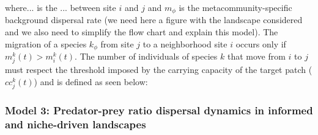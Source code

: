 %
%
%
%
%

where... is the ... between site $i$ and $j$ and $m_{\mathcal{\phi}}$
is the metacommunity-specific background dispersal rate (we need here
a figure with the landscape considered and we also need to simplify
the flow chart and explain this model). The migration of a species
$k_{\mathcal{\phi}}$ from site $j$ to a neighborhood site $i$ occurs
only if $m_{j}^k(t) > m_{i}^k(t)$. The number of individuals of
species $k$ that move from $i$ to $j$ must respect the threshold
imposed by the carrying capacity of the target patch ($cc_j^k(t)$) and
is defined as seen below:

\subsubsection{Model 3: Predator-prey ratio dispersal dynamics in informed and niche-driven landscapes}



